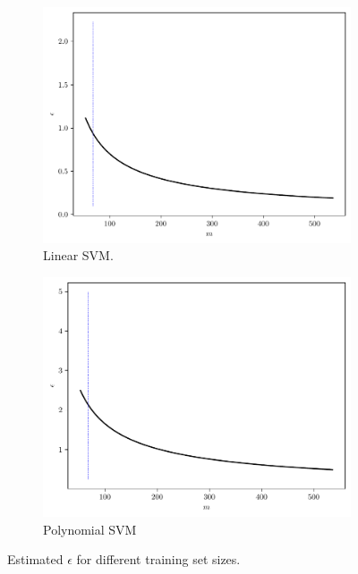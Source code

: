 \documentclass[conference]{IEEEtran}
\theoremstyle{definition}
\theoremstyle{remark}
\theoremstyle{remark}
\begin{document}
\begin{figure}
    \centering
    \begin{subfigure}[b]{0.45\textwidth}
        \centering
        \includegraphics[width=\textwidth]{figs/svm-emb-linear-error.pdf}
        \caption{Linear SVM.}
    \end{subfigure}
    \begin{subfigure}[b]{0.45\textwidth}
        \centering
        \includegraphics[width=\textwidth]{figs/svm-emb-poly-error.pdf}
        \caption{Polynomial SVM}
    \end{subfigure}
    \caption{Estimated $\epsilon$ for different training set sizes.}
    \label{fig:error-SVM-emb}
\end{figure}
\end{document}
